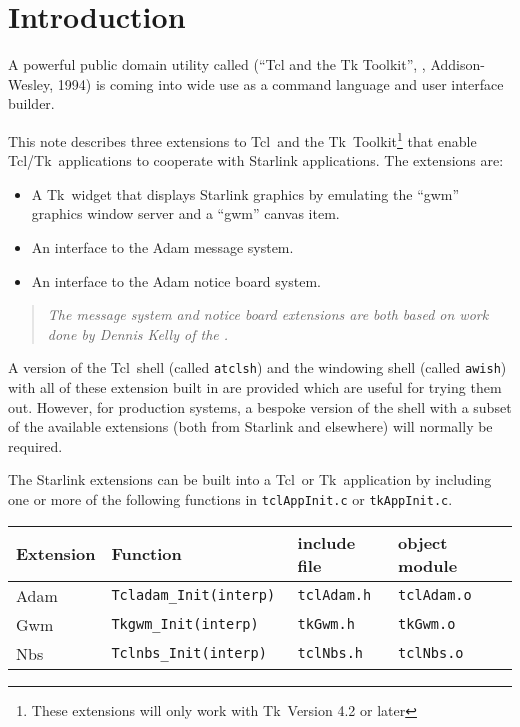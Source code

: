 \documentclass[twoside,11pt,nolof]{starlink}
\providecommand{\Tcl}{{\textsf{Tcl}}}
\providecommand{\Tk}{{\textsf{Tk}}}
\providecommand{\TclTk}{{\textsf{Tcl/Tk}}}
\begin{document}
\scfrontmatter

\section{\label{introduction}Introduction}

A powerful public domain utility called
\htmladdnormallink{\TclTk}{http://sunscript.sun.com/} (``Tcl and the Tk
Toolkit'', ,
Addison-Wesley, 1994) is coming into wide use as a command language and
user interface builder.

This note describes three extensions to \Tcl\ and the \Tk\ Toolkit\footnote{
These extensions will only work with \Tk\ Version 4.2 or later} that
enable \TclTk\ applications to cooperate with Starlink applications. The
extensions are:

\begin{itemize}
\item A \Tk\ widget that displays Starlink graphics by emulating the ``gwm''
graphics window server and a ``gwm'' canvas item.
\item An interface to the Adam message system.
\item An interface to the Adam notice board system.
\end{itemize}

\begin{quote}
\emph{The message system and notice board extensions are both based on work
done by Dennis Kelly of the
.  }
\end{quote}

A version of the \Tcl\ shell (called {\tt{atclsh}}) and the windowing
shell (called {\tt{awish}}) with all of these extension built in are
provided which are useful for trying them out. However, for production
systems, a bespoke version of the shell with a subset of the available
extensions (both from Starlink and elsewhere) will normally be
required.

The Starlink extensions can be built into a \Tcl\ or \Tk\ application
by including one or more of the following functions in
{\tt{tclAppInit.c}} or {\tt{tkAppInit.c}}.

\begin{center}
\begin{tabular}{|l|l|l|l|}
\hline
Extension &Function &include file &object module\\
\hline
Adam &\tt Tcladam\_Init(interp) &\tt tclAdam.h &\tt tclAdam.o\\
Gwm &\tt Tkgwm\_Init(interp) &\tt tkGwm.h &\tt tkGwm.o\\
Nbs &\tt Tclnbs\_Init(interp) &\tt tclNbs.h &\tt tclNbs.o\\
\hline
\end{tabular}
\end{center}
\end{document}
